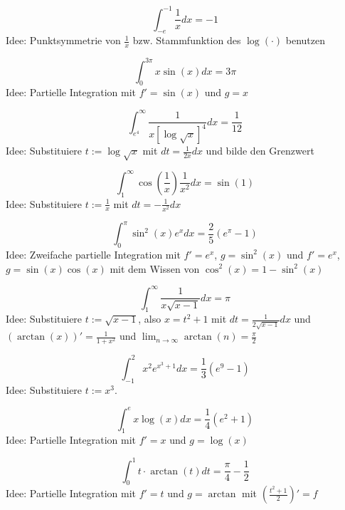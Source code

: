 \begin{displaymath}
  \int_{-e}^{-1} \frac{1}{x} dx = -1
\end{displaymath}
Idee: Punktsymmetrie von $\frac{1}{x}$ bzw. Stammfunktion des $\log(\cdot)$ benutzen

\begin{displaymath}
  \int_{0}^{3\pi} x \sin(x) dx = 3\pi
\end{displaymath}
Idee: Partielle Integration mit $f' = \sin(x)$ und $g = x$

\begin{displaymath}
  \int_{e^4}^{\infty} \frac{1}{x[\log\sqrt{x}]^4}dx = \frac{1}{12}
\end{displaymath}
Idee: Substituiere $t := \log\sqrt{x}$ mit $dt = \frac{1}{2x}dx$ und bilde den Grenzwert

\begin{displaymath}
  \int_{1}^{\infty} \cos\left(\frac{1}{x}\right) \frac{1}{x^2} dx = \sin(1)
\end{displaymath}
Idee: Substituiere $t := \frac{1}{x}$ mit $dt = -\frac{1}{x^2}dx$

\begin{displaymath}
  \int_{0}^{\pi} \sin^2(x) e^x dx = \frac{2}{5} \left(e^{\pi} - 1\right)
\end{displaymath}
Idee: Zweifache partielle Integration mit $f' = e^x$, $g = \sin^2(x)$ und $f' = e^x$, $g = \sin(x)\cos(x)$ mit dem Wissen von $\cos^2(x) = 1 - \sin^2(x)$

\begin{displaymath}
  \int_{1}^{\infty} \frac{1}{x\sqrt{x - 1}} dx = \pi
\end{displaymath}
Idee: Substituiere $t := \sqrt{x - 1}$, also $x = t^2 + 1$ mit $dt = \frac{1}{2\sqrt{x - 1}}dx$ und $\left(\arctan(x)\right)' = \frac{1}{1 + x^2}$ und $\lim_{n \to \infty} \arctan(n) = \frac{\pi}{2}$

\begin{displaymath}
  \int_{-1}^{2} x^2 e^{x^3 + 1} dx = \frac{1}{3} \left(e^9 - 1\right)
\end{displaymath}
Idee: Substituiere $t := x^3$.

\begin{displaymath}
  \int_{1}^{e} x \log(x) dx = \frac{1}{4} \left(e^2 + 1\right)
\end{displaymath}
Idee: Partielle Integration mit $f' = x$ und $g = \log(x)$

\begin{displaymath}
  \int_{0}^{1} t \cdot \arctan(t) dt = \frac{\pi}{4} - \frac{1}{2}
\end{displaymath}
Idee: Partielle Integration mit $f' = t$ und $g = \arctan$ mit $\left(\frac{t^2 + 1}{2}\right)' = f$

